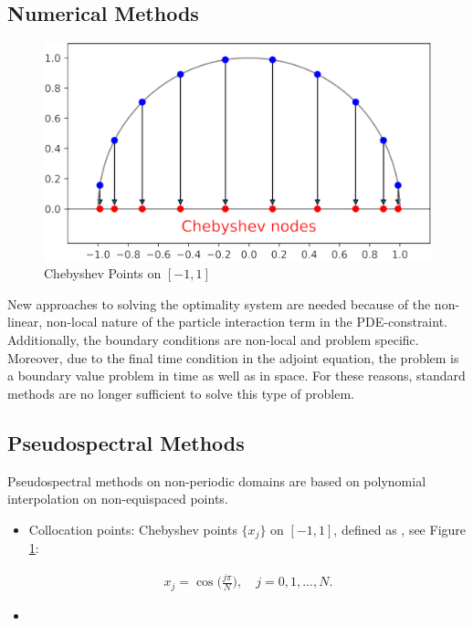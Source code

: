 \documentclass[a0,portrait]{a0poster}
\begin{document}
\begin{multicols}{2}
\section*{Numerical Methods}
	\begin{figure}
	\includegraphics[width=12cm]{chebnodes1.png}
	\caption{\color{Blue} Chebyshev Points on $[-1,1]$}
	\label{Cheb}
\end{figure}
New approaches to solving the optimality system are needed because of the non-linear, non-local nature of the particle interaction term in the PDE-constraint. Additionally, the boundary conditions are non-local and problem specific. Moreover, due to the final time condition in the adjoint equation, the problem is a boundary value problem in time as well as in space. For these reasons, standard methods are no longer sufficient to solve this type of problem. 

\subsection*{Pseudospectral Methods} 

Pseudospectral methods on non-periodic domains are based on polynomial interpolation on non-equispaced points.   

\begin{itemize}

	\item
	
Collocation points: Chebyshev points $\{x_j\}$ on $[-1,1]$, defined as \cite{bibTrefethen}, see Figure \ref{Cheb}:

\begin{align*}
x_j= \cos\bigg(\frac{j \pi}{N}\bigg), \quad j=0,1,...,N.
\end{align*}	


\item


\end{itemize}
\end{multicols}
\end{document}
